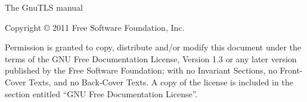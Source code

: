\thispagestyle{empty}

\begin{center}
\huge{The GnuTLS manual}
\end{center}



\newpage

\thispagestyle{empty}


\begin{flushleft}
Copyright \copyright{} 2011 Free Software Foundation, Inc.
\end{flushleft}

\begin{flushleft}
Permission is granted to copy, distribute and/or modify this document
under the terms of the GNU Free Documentation License, Version 1.3 or
any later version published by the Free Software Foundation; with no
Invariant Sections, no Front-Cover Texts, and no Back-Cover Texts.  A
copy of the license is included in the section entitled ``GNU Free
Documentation License''.
\end{flushleft}


